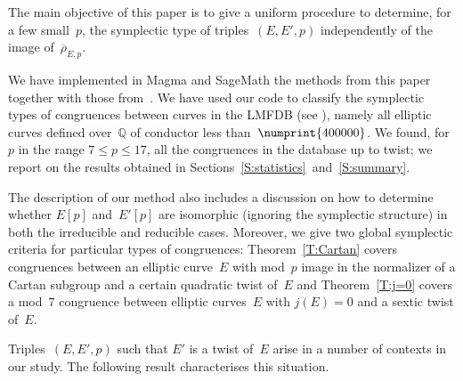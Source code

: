 \documentclass[12pt]{amsart}
\newcommand{\Q}{\mathbb{Q}}
\newcommand{\rhobar}{{\overline{\rho}}}
\numberwithin{equation}{section}
\theoremstyle{definition}
\theoremstyle{remark}
\newcommand{\Sage}{{\sc SageMath}}
\newcommand{\Magma}{{\sc Magma}}
\begin{document}
The main objective of this paper is to give a uniform procedure to
determine, for a few small~$p$, the symplectic type of
triples~$(E,E',p)$ independently of the image of~$\rhobar_{E,p}$.

We have implemented in {\Magma} \cite{magma} and {\Sage} \cite{sage}
the methods from this paper together with those from~\cite{FKSym}. We
have used our code to classify the symplectic types of congruences
between curves in the LMFDB (see \cite{lmfdb}), namely all elliptic
curves defined over~$\Q$ of conductor less than~$\numprint{400000}$.
We found, for $p$ in the range $7 \leq p \leq 17$, all the congruences
in the database up to twist; we report on the results obtained in
Sections~\ref{S:statistics}~and~\ref{S:summary}.

The description of our method also includes a discussion on how to
determine whether $E[p]$ and~$E'[p]$ are isomorphic (ignoring the
symplectic structure) in both the irreducible and reducible
cases. Moreover, we give two global symplectic criteria for particular
types of congruences: Theorem~\ref{T:Cartan} covers congruences
between an elliptic curve~$E$ with mod~$p$ image in the normalizer of
a Cartan subgroup and a certain quadratic twist of~$E$ and
Theorem~\ref{T:j=0} covers a mod~$7$ congruence between elliptic
curves~$E$ with $j(E)=0$ and a sextic twist of~$E$.

Triples~$(E,E',p)$ such that $E'$ is a twist of~$E$ arise in a number
of contexts in our study.  The following result characterises this
situation.
\end{document}
